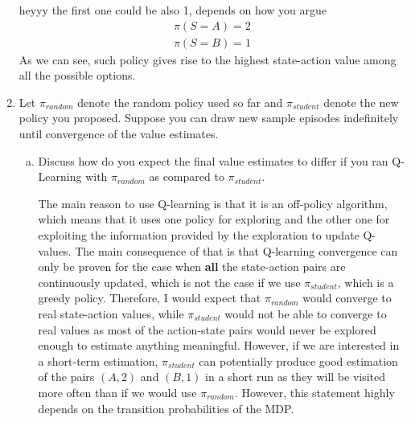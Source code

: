 \documentclass{exam}
\begin{document}
\begin{problem}
\begin{enumerate}
\begin{solutionorlines}[2in]
    heyyy the first one could be also 1, depends on how you argue
    \begin{align*}
        \pi(S=A) = 2\\
        \pi(S=B) = 1
    \end{align*}
    As we can see, such policy gives rise to the highest state-action value among all the possible options. 
    \end{solutionorlines}
    \item Let $\pi_{random}$ denote the random policy used so far and $\pi_{student}$ denote the new policy you proposed. Suppose you can draw new sample episodes indefinitely until convergence of the value estimates.
    \begin{enumerate}[(a)]
        \item Discuss how do you expect the final value estimates to differ if you ran Q-Learning with  $\pi_{random}$ as compared to $\pi_{student}$.
        \begin{solutionorlines}[2in]
        The main reason to use Q-learning is that it is an off-policy algorithm, which means that it uses one policy for exploring and the other one for exploiting the information provided by the exploration to update Q-values. The main consequence of that is that Q-learning convergence can only be proven for the case when \textbf{all} the state-action pairs are continuously updated, which is not the case if we use $\pi_{student}$, which is a greedy policy. Therefore, I would expect that $\pi_{random}$ would converge to real state-action values, while $\pi_{student}$ would not be able to converge to real values as most of the action-state pairs would never be explored enough to estimate anything meaningful. However, if we are interested in a short-term estimation, $\pi_{student}$ can potentially produce good estimation of the pairs $(A, 2)$ and $(B, 1)$ in a short run as they will be visited more often than if we would use $\pi_{random}$. However, this statement highly depends on the transition probabilities of the MDP.

\end{solutionorlines}
\end{enumerate}
\end{enumerate}
\end{problem}
\end{document}
